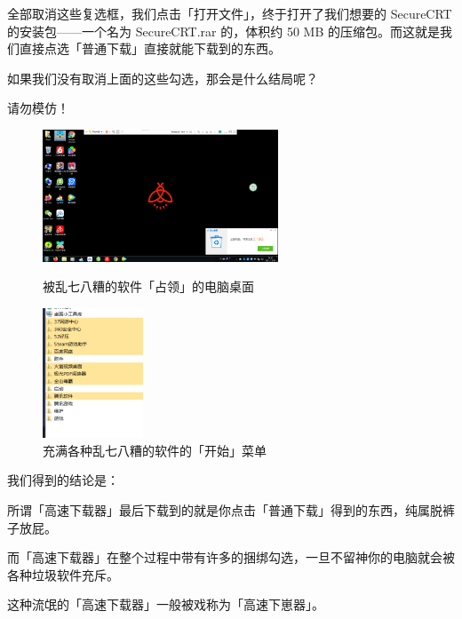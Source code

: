 全部取消这些复选框，我们点击「打开文件」，终于打开了我们想要的 SecureCRT 的安装包——一个名为 SecureCRT.rar 的，体积约 50 MB 的压缩包。而这就是我们直接点选「普通下载」直接就能下载到的东西。

如果我们没有取消上面的这些勾选，那会是什么结局呢？

\begin{warning}
  请勿模仿！
\end{warning}

\begin{figure}[H]
  \centering
  \begin{minipage}{8cm}
    \centering
    \includegraphics[width=7cm]{assets/Gao_su_4.png}
    \caption{被乱七八糟的软件「占领」的电脑桌面}
    \label{gao-su-downloader-4}
  \end{minipage}
  \qquad
  \begin{minipage}{4cm}
    \centering
    \includegraphics[width=3cm]{assets/Gao_su_5.png}
    \caption{充满各种乱七八糟的软件的「开始」菜单}
    \label{gao-su-downloader-5}
  \end{minipage} 
\end{figure}

我们得到的结论是：

所谓「高速下载器」最后下载到的就是你点击「普通下载」得到的东西，纯属脱裤子放屁。

而「高速下载器」在整个过程中带有许多的捆绑勾选，一旦不留神你的电脑就会被各种垃圾软件充斥。

\begin{note}
  这种流氓的「高速下载器」一般被戏称为「高速下崽器」。
\end{note}

\practice

